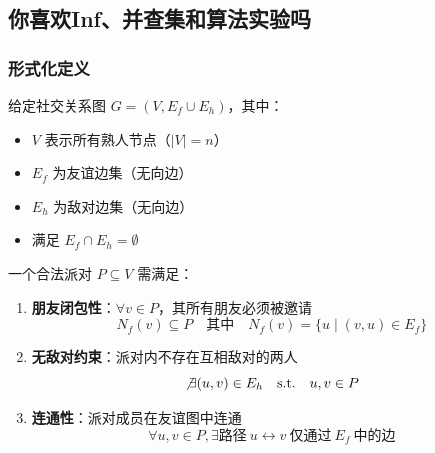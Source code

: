 \documentclass[../mainReport.tex]{subfiles} %
\begin{document}


\subsection{你喜欢Inf、并查集和算法实验吗}

\subsubsection{形式化定义}
给定社交关系图 $G=(V, E_f \cup E_h)$，其中：
\begin{itemize}
    \item $V$ 表示所有熟人节点（$|V|=n$）
    \item $E_f$ 为友谊边集（无向边）
    \item $E_h$ 为敌对边集（无向边）
    \item 满足 $E_f \cap E_h = \emptyset$
\end{itemize}

一个合法派对 $P \subseteq V$ 需满足：
\begin{enumerate}
    \item \textbf{朋友闭包性}：$\forall v \in P$，其所有朋友必须被邀请
    $$ N_f(v) \subseteq P \quad \text{其中} \quad N_f(v) = \{ u \mid (v,u) \in E_f \} $$
    
    \item \textbf{无敌对约束}：派对内不存在互相敌对的两人
    \begin{equation*}
        \not \exists (u,v) \in E_h \quad \text{s.t.} \quad u,v \in P 
    \end{equation*}
    
    \item \textbf{连通性}：派对成员在友谊图中连通
    $$ \forall u,v \in P, \exists \text{路径} \ u \leftrightarrow v \ \text{仅通过} \ E_f \ \text{中的边} $$
\end{enumerate}
\end{document}
